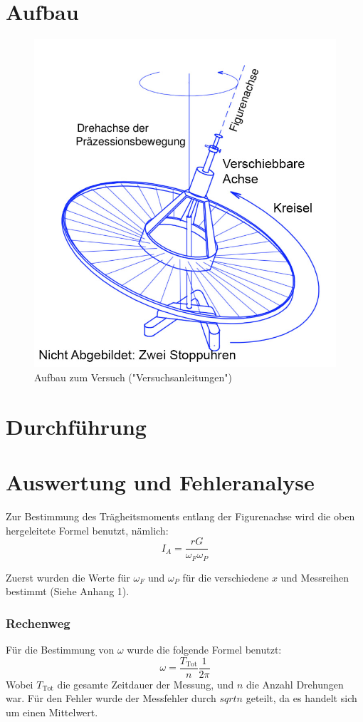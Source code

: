 \documentclass[11pt,a4paper]{article} %
\begin{document}
\section{Aufbau}

\begin{figure}[h]
	\centering
	\includegraphics[scale=0.5]{Abb}
	\caption{Aufbau zum Versuch ("Versuchsanleitungen")}
\end{figure}
\section{Durchführung}

\section{Auswertung und Fehleranalyse}
Zur Bestimmung des Trägheitsmoments entlang der Figurenachse wird die oben hergeleitete Formel benutzt, nämlich:
$$I_A = \frac{rG}{\omega_F \omega_P}$$

Zuerst wurden die Werte für $\omega_F$ und $\omega_P$ für die verschiedene $x$ und Messreihen bestimmt (Siehe Anhang 1). 
\begin{tcolorbox}[colback=white]
\subsubsection{Rechenweg}
Für die Bestimmung von $\omega$ wurde die folgende Formel benutzt:
$$ \omega = \frac{T_\textrm{Tot}}{n}\frac{1}{2\pi}$$
Wobei $T_\textrm{Tot}$ die gesamte Zeitdauer der Messung, und $n$ die Anzahl Drehungen war.
Für den Fehler wurde der Messfehler durch $sqrt{n}$ geteilt, da es handelt sich um einen Mittelwert.
\end{tcolorbox}
\end{document}
